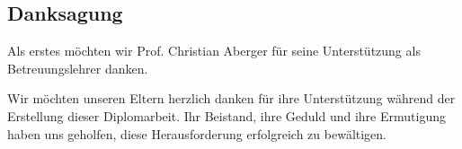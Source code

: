 \begin{spacing}{1}
    \chapter*{Danksagung}
\end{spacing}
Als erstes möchten wir Prof. Christian Aberger
für seine Unterstützung als Betreuungslehrer danken.

Wir möchten unseren Eltern herzlich danken für ihre Unterstützung während 
der Erstellung dieser Diplomarbeit. Ihr Beistand, ihre Geduld und ihre 
Ermutigung haben uns geholfen, diese Herausforderung erfolgreich zu bewältigen.
